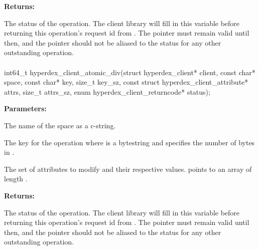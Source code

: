 \noindent\textbf{Returns:}
\begin{description}[labelindent=\widthof{{\code{status}}},leftmargin=*,noitemsep,nolistsep,align=right]
\item[\code{status}] The status of the operation.  The client library will fill in this variable before returning this operation's request id from .  The pointer must remain valid until then, and the pointer should not be aliased to the status for any other outstanding operation.
\end{description}

\paragraph{}
\label{api:c:atomic_div}
\begin{ccode}
int64_t hyperdex_client_atomic_div(struct hyperdex_client* client,
        const char* space,
        const char* key, size_t key_sz,
        const struct hyperdex_client_attribute* attrs, size_t attrs_sz,
        enum hyperdex_client_returncode* status);
\end{ccode}
\funcdesc 

\noindent\textbf{Parameters:}
\begin{description}[labelindent=\widthof{{\code{attrs}, \code{attrs\_sz}}},leftmargin=*,noitemsep,nolistsep,align=right]
\item[\code{space}] The name of the space as a c-string.
\item[\code{key}, \code{key\_sz}] The key for the operation where  is a bytestring and  specifies the number of bytes in .
\item[\code{attrs}, \code{attrs\_sz}] The set of attributes to modify and their respective values.   points to an array of length .
\end{description}

\noindent\textbf{Returns:}
\begin{description}[labelindent=\widthof{{\code{status}}},leftmargin=*,noitemsep,nolistsep,align=right]
\item[\code{status}] The status of the operation.  The client library will fill in this variable before returning this operation's request id from .  The pointer must remain valid until then, and the pointer should not be aliased to the status for any other outstanding operation.
\end{description}

